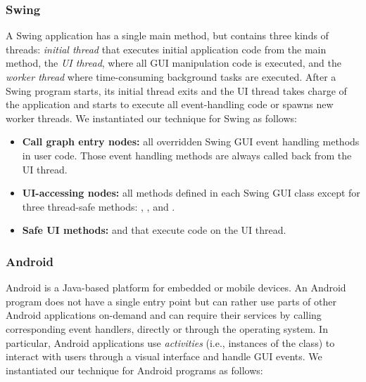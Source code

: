 \subsubsection{Swing}


A Swing application has a single main method, but contains three kinds of
threads: \textit{initial thread} that executes initial application code from the main method,
the \textit{UI thread}, where all GUI manipulation code is executed,
and the \textit{worker thread} where time-consuming background tasks are executed.
After a Swing program starts, its initial thread exits and the UI thread takes charge
of the application and starts to execute all event-handling code or spawns new worker threads. 
We instantiated our technique for Swing as follows:

\begin{itemize}

\item \textbf{Call graph entry nodes:} all overridden Swing GUI event handling
methods in user code. Those event handling methods are always
called back from the UI thread.

\smallstep

\item \textbf{UI-accessing nodes:} %
all methods defined in each Swing GUI class except for three thread-safe
methods: , , and .

\smallstep

\item \textbf{Safe UI methods: } 
 and  that execute code on the UI thread.

\end{itemize}

\smallstep

\subsubsection{Android}

Android is a Java-based platform for embedded or mobile devices. 
An Android program does not have a single entry point but can
rather use parts of other Android applications on-demand and can require their
services by calling corresponding event handlers, directly or through the
operating system. In particular, Android applications use \textit{activities}
(i.e., instances of the  class)
to interact with users through a visual interface and handle GUI events.
We instantiated our technique for Android programs as follows:


